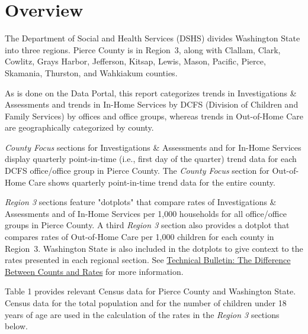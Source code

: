 \documentclass{article}\usepackage{graphicx, color}
\begin{document}
\vspace{-18pt}

\section*{Overview}

The Department of Social and Health Services (DSHS) divides Washington State into three regions. Pierce County is in Region~3, along with Clallam, Clark, Cowlitz, Grays Harbor, Jefferson, Kitsap, Lewis, Mason, Pacific, Pierce, Skamania, Thurston, and Wahkiakum counties.

As is done on the Data Portal, this report categorizes trends in Investigations \& Assessments and trends in In-Home Services by DCFS (Division of Children and Family Services) by offices and office groups, whereas trends in Out-of-Home Care are geographically categorized by county. 

\emph{County Focus} sections for Investigations \& Assessments and for In-Home Services display quarterly point-in-time (i.e., first day of the quarter) trend data for each DCFS office/office group in Pierce County. The \emph{County Focus} section for Out-of-Home Care shows quarterly point-in-time trend data for the entire county.

\emph{Region 3} sections feature "dotplots" that compare rates of Investigations \& Assessments and of In-Home Services per 1,000 households for all office/office groups in Pierce County. A third \emph{Region 3} section also provides a dotplot that compares rates of Out-of-Home Care per 1,000 children for each county in Region~3. Washington State is also included in the dotplots to give context to the rates presented in each regional section.  See \href{http://www.partnersforourchildren.org/publications/counts-vs-rates}{Technical Bulletin: The Difference Between Counts and Rates} for more information.

Table 1 provides relevant Census data for Pierce County and Washington State. Census data for the total population and for the number of children under 18 years of age are used in the calculation of the rates in the \emph{Region 3} sections below.
\end{document}
